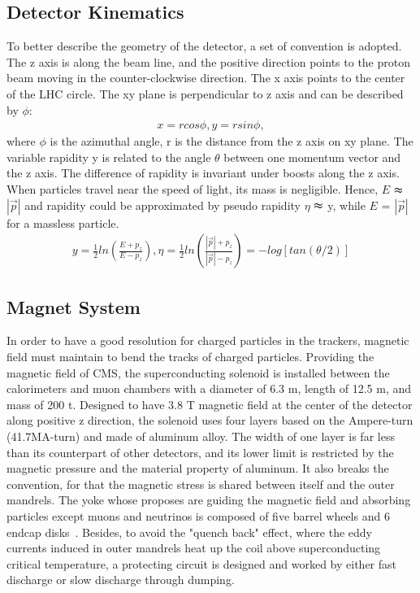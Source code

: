 \subsection{Detector Kinematics} 
To better describe the geometry of the detector, a set of convention is adopted. The z axis is along the beam line, and the positive direction points to the proton beam moving in the counter-clockwise direction. The x axis points to the center of the LHC circle. The xy plane is perpendicular to z axis and can be described by $\phi $:
\begin{equation} \label{eq1}
\begin{split}
x=rcos\phi, y=rsin\phi,
\end{split}
\end{equation}
where $\phi$ is the azimuthal angle, r is the distance from the z axis on xy plane. The variable rapidity y is related to the angle $\theta$ between one momentum vector and the z axis. The difference of rapidity is invariant under boosts along the z axis. When particles travel near the speed of light, its mass is negligible. Hence, $E$ $\thickapprox$ $|\vec{p}|$ and rapidity could be approximated by pseudo rapidity $\eta$ $\thickapprox$ y, while $E$ = $|\vec{p}|$ for a massless particle.
\begin{equation} \label{eq1}
\begin{split}
y = \frac{1}{2} ln( \frac{E+p_z}{E-p_z} ), \eta = \frac{1}{2} ln( \frac{|\vec{p}|+p_z}{|\vec{p}|-p_z} ) = -log[tan(\theta /2)]
\end{split}
\end{equation}

\subsection{Magnet System} 
In order to have a good resolution for charged particles in the trackers, magnetic field must maintain to bend the tracks of charged particles. 
Providing the magnetic field of CMS, the superconducting solenoid is installed between the calorimeters and muon chambers with a diameter of 6.3 m, length of 12.5 m, and mass of 200 t. 
Designed to have 3.8 T magnetic field at the center of the detector along positive z direction, the solenoid uses four layers based on the Ampere-turn (41.7MA-turn) and made of aluminum alloy.
The width of one layer is far less than its counterpart of other detectors, and its lower limit is restricted by the magnetic pressure and the material property of aluminum.
It also breaks the convention, for that the magnetic stress is shared between itself and the outer mandrels. 
The yoke whose proposes are guiding the magnetic field and absorbing particles except muons and neutrinos is composed of five barrel wheels and 6 endcap disks~\citep{yoke}. 
Besides, to avoid the "quench back" effect, where the eddy currents induced in outer mandrels heat up the coil above superconducting critical temperature, 
a protecting circuit is designed and worked by either fast discharge or slow discharge through dumping. 

